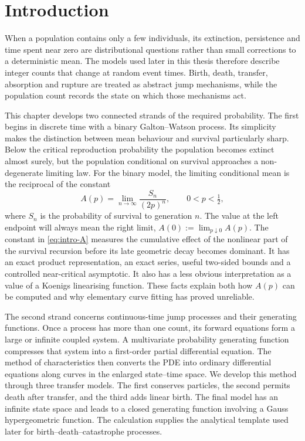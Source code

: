 \section{Introduction}
\label{sec:introduction}

When a population contains only a few individuals, its extinction, persistence and
time spent near zero are distributional questions rather than small corrections to a
deterministic mean.  The models used later in this thesis therefore describe integer
counts that change at random event times.  Birth, death, transfer, absorption and
rupture are treated as abstract jump mechanisms, while the population count records
the state on which those mechanisms act.

This chapter develops two connected strands of the required probability.  The first
begins in discrete time with a binary Galton--Watson process.  Its simplicity makes
the distinction between mean behaviour and survival particularly sharp.  Below the
critical reproduction probability the population becomes extinct almost surely, but
the population conditional on survival approaches a non-degenerate limiting law.
For the binary model, the limiting conditional mean is the reciprocal of the
constant
\begin{equation}
  A(p)=\lim_{n\to\infty}\frac{S_n}{(2p)^n},
  \qquad 0<p<\tfrac12,
  \label{eq:intro-A}
\end{equation}
where \(S_n\) is the probability of survival to generation \(n\).  The value at the
left endpoint will always mean the right limit, \(A(0):=\lim_{p\downarrow0}A(p)\).
The constant in \cref{eq:intro-A} measures the cumulative effect of the nonlinear
part of the survival recursion before its late geometric decay becomes dominant.
It has an exact product representation, an exact series, useful two-sided bounds and
a controlled near-critical asymptotic.  It also has a less obvious interpretation as
a value of a Koenigs linearising function.  These facts explain both how \(A(p)\) can
be computed and why elementary curve fitting has proved unreliable.

The second strand concerns continuous-time jump processes and their generating
functions.  Once a process has more than one count, its forward equations form a
large or infinite coupled system.  A multivariate probability generating function
compresses that system into a first-order partial differential equation.  The method
of characteristics then converts the PDE into ordinary differential equations along
curves in the enlarged state--time space.  We develop this method through three
transfer models.  The first conserves particles, the second permits death after
transfer, and the third adds linear birth.  The final model has an infinite state
space and leads to a closed generating function involving a Gauss hypergeometric
function.  The calculation supplies the analytical template used later for
birth--death--catastrophe processes.

